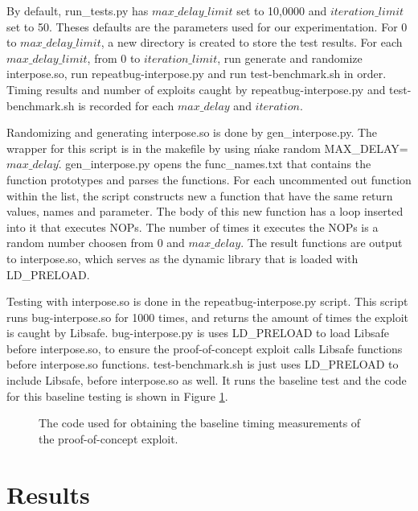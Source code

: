 \documentclass[letterpaper,twocolumn,10pt]{article}
\begin{document}
By default, run\_tests.py has $max\_delay\_limit$ set to 10,0000 and $iteration\_limit$ set to 50.  Theses defaults are the parameters used for our experimentation. For 0 to $max\_delay\_limit$, a new directory is created to store the test results.  For each $max\_delay\_limit$, from 0 to $iteration\_limit$, run generate and randomize interpose.so, run repeatbug-interpose.py and run test-benchmark.sh in order.  Timing results and number of exploits caught by repeatbug-interpose.py and test-benchmark.sh is recorded for each $max\_delay$ and $iteration$.

Randomizing and generating interpose.so is done by gen\_interpose.py.  The wrapper for this script is in the makefile by using \'make random MAX\_DELAY=$max\_delay$\'.  gen\_interpose.py opens the func\_names.txt that contains the function prototypes and parses the functions.  For each uncommented out function within the list, the script constructs new a function that have the same return values, names and parameter.  The body of this new function has a loop inserted into it that executes NOPs.  The number of times it executes the NOPs is a random number choosen from 0 and $max\_delay$.  The result functions are output to interpose.so, which serves as the dynamic library that is loaded with LD\_PRELOAD.

Testing with interpose.so is done in the repeatbug-interpose.py script.  This script runs bug-interpose.so for 1000 times, and returns the amount of times the exploit is caught by Libsafe.  bug-interpose.py is uses LD\_PRELOAD to load Libsafe before interpose.so, to ensure the proof-of-concept exploit calls Libsafe functions before interpose.so functions. test-benchmark.sh is just uses LD\_PRELOAD to include Libsafe, before interpose.so as well.  It runs the baseline test and the code for this baseline testing is shown in Figure \ref{fig_baseline}.



\begin{figure}

\caption{The code used for obtaining the baseline timing measurements of the proof-of-concept exploit.}
\label{fig_baseline}
\end{figure}

\section{Results}
\end{document}
